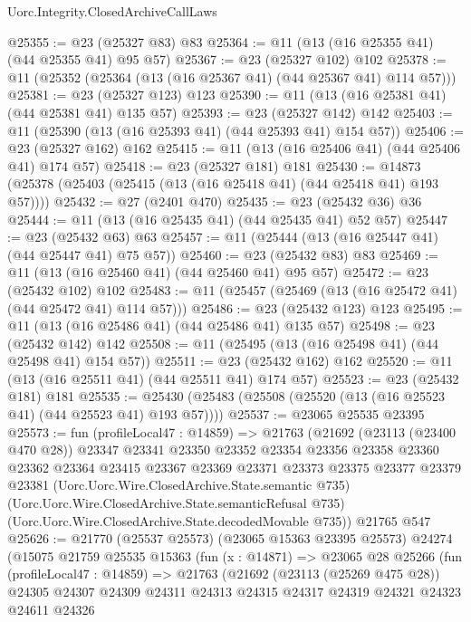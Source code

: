 \begin{lexlean}{Uorc.Integrity.ClosedArchiveCallLaws}
\begin{coremodule}
@25355 := @23 (@25327 @83) @83
@25364 := @11 (@13 (@16 @25355 @41) (@44 @25355 @41) @95 @57)
@25367 := @23 (@25327 @102) @102
@25378 := @11 (@25352 (@25364 (@13 (@16 @25367 @41) (@44 @25367 @41) @114 @57)))
@25381 := @23 (@25327 @123) @123
@25390 := @11 (@13 (@16 @25381 @41) (@44 @25381 @41) @135 @57)
@25393 := @23 (@25327 @142) @142
@25403 := @11 (@25390 (@13 (@16 @25393 @41) (@44 @25393 @41) @154 @57))
@25406 := @23 (@25327 @162) @162
@25415 := @11 (@13 (@16 @25406 @41) (@44 @25406 @41) @174 @57)
@25418 := @23 (@25327 @181) @181
@25430 := @14873 (@25378 (@25403 (@25415 (@13 (@16 @25418 @41) (@44 @25418 @41) @193 @57))))
@25432 := @27 (@2401 @470)
@25435 := @23 (@25432 @36) @36
@25444 := @11 (@13 (@16 @25435 @41) (@44 @25435 @41) @52 @57)
@25447 := @23 (@25432 @63) @63
@25457 := @11 (@25444 (@13 (@16 @25447 @41) (@44 @25447 @41) @75 @57))
@25460 := @23 (@25432 @83) @83
@25469 := @11 (@13 (@16 @25460 @41) (@44 @25460 @41) @95 @57)
@25472 := @23 (@25432 @102) @102
@25483 := @11 (@25457 (@25469 (@13 (@16 @25472 @41) (@44 @25472 @41) @114 @57)))
@25486 := @23 (@25432 @123) @123
@25495 := @11 (@13 (@16 @25486 @41) (@44 @25486 @41) @135 @57)
@25498 := @23 (@25432 @142) @142
@25508 := @11 (@25495 (@13 (@16 @25498 @41) (@44 @25498 @41) @154 @57))
@25511 := @23 (@25432 @162) @162
@25520 := @11 (@13 (@16 @25511 @41) (@44 @25511 @41) @174 @57)
@25523 := @23 (@25432 @181) @181
@25535 := @25430 (@25483 (@25508 (@25520 (@13 (@16 @25523 @41) (@44 @25523 @41) @193 @57))))
@25537 := @23065 @25535 @23395
@25573 := fun (profileLocal47 : @14859) =>
  @21763
    (@21692
      (@23113 (@23400 @470 @28))
      @23347
      @23341
      @23350
      @23352
      @23354
      @23356
      @23358
      @23360
      @23362
      @23364
      @23415
      @23367
      @23369
      @23371
      @23373
      @23375
      @23377
      @23379
      @23381
      (Uorc.Uorc.Wire.ClosedArchive.State.semantic @735)
      (Uorc.Uorc.Wire.ClosedArchive.State.semanticRefusal @735)
      (Uorc.Uorc.Wire.ClosedArchive.State.decodedMovable @735))
    @21765
    @547
@25626 := @21770
    (@25537 @25573)
    (@23065 @15363 @23395 @25573)
    @24274
    (@15075
      @21759
      @25535
      @15363
      (fun (x : @14871) =>
      @23065
        @28
        @25266
        (fun (profileLocal47 : @14859) =>
        @21763
          (@21692
            (@23113 (@25269 @475 @28))
            @24305
            @24307
            @24309
            @24311
            @24313
            @24315
            @24317
            @24319
            @24321
            @24323
            @24611
            @24326

\end{coremodule}
\end{lexlean}
